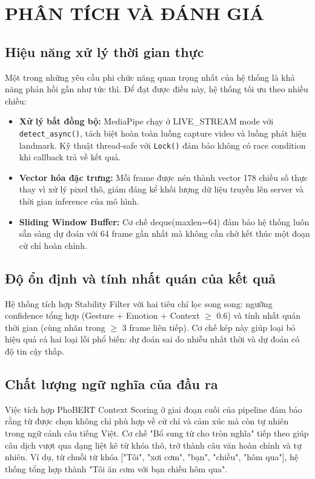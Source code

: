 
\chapter{PHÂN TÍCH VÀ ĐÁNH GIÁ}
 
\section{Hiệu năng xử lý thời gian thực}
 
Một trong những yêu cầu phi chức năng quan trọng nhất của hệ thống là khả năng phản hồi gần như tức thì. Để đạt được điều này, hệ thống tối ưu theo nhiều chiều:
 
\begin{itemize}
    \item \textbf{Xử lý bất đồng bộ:} MediaPipe chạy ở LIVE\_STREAM mode với \texttt{detect\_async()}, tách biệt hoàn toàn luồng capture video và luồng phát hiện landmark. Kỹ thuật thread-safe với \texttt{Lock()} đảm bảo không có race condition khi callback trả về kết quả.
 
    \item \textbf{Vector hóa đặc trưng:} Mỗi frame được nén thành vector 178 chiều số thực thay vì xử lý pixel thô, giảm đáng kể khối lượng dữ liệu truyền lên server và thời gian inference của mô hình.
 
    \item \textbf{Sliding Window Buffer:} Cơ chế deque(maxlen=64) đảm bảo hệ thống luôn sẵn sàng dự đoán với 64 frame gần nhất mà không cần chờ kết thúc một đoạn cử chỉ hoàn chỉnh.
\end{itemize}
 
\section{Độ ổn định và tính nhất quán của kết quả}
 
Hệ thống tích hợp Stability Filter với hai tiêu chí lọc song song: ngưỡng confidence tổng hợp (Gesture + Emotion + Context $\geq$ 0.6) và tính nhất quán thời gian (cùng nhãn trong $\geq$ 3 frame liên tiếp). Cơ chế kép này giúp loại bỏ hiệu quả cả hai loại lỗi phổ biến: dự đoán sai do nhiễu nhất thời và dự đoán có độ tin cậy thấp.
 
\section{Chất lượng ngữ nghĩa của đầu ra}
 
Việc tích hợp PhoBERT Context Scoring ở giai đoạn cuối của pipeline đảm bảo rằng từ được chọn không chỉ phù hợp về cử chỉ và cảm xúc mà còn tự nhiên trong ngữ cảnh câu tiếng Việt. Cơ chế "Bổ sung từ cho tròn nghĩa" tiếp theo giúp câu dịch vượt qua dạng liệt kê từ khóa thô, trở thành câu văn hoàn chỉnh và tự nhiên. Ví dụ, từ chuỗi từ khóa ["Tôi", "xơi cơm", "bạn", "chiều", "hôm qua"], hệ thống tổng hợp thành "Tôi ăn cơm với bạn chiều hôm qua".
 